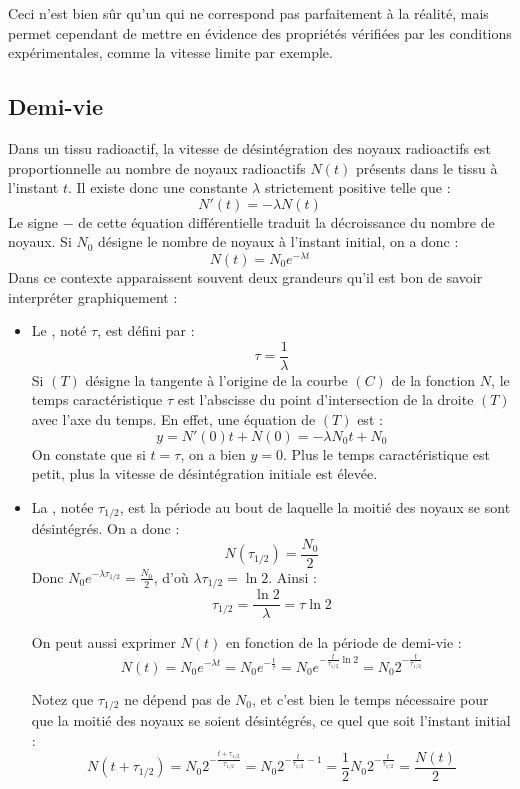 \documentclass[class=report,crop=false]{standalone}
\begin{document}
Ceci n'est bien sûr qu'un  qui ne correspond
pas parfaitement à la réalité, mais permet cependant de mettre en évidence
des propriétés vérifiées par les conditions expérimentales, comme la vitesse limite par exemple.


\subsection{Demi-vie}

Dans un tissu radioactif, la vitesse de désintégration des noyaux radioactifs
est proportionnelle au nombre de noyaux radioactifs $N(t)$ présents dans le
tissu à l'instant $t$. Il existe donc une constante $\lambda$ strictement positive telle que :
$$N'(t) = -\lambda N(t)$$
Le signe \og $-$\fg{} de cette équation différentielle traduit la
décroissance du nombre de noyaux.
Si $N_0$ désigne le nombre de noyaux à l'instant initial, on a donc :
$$N(t) = N_0 e^{-\lambda t}$$
Dans ce contexte apparaissent souvent deux grandeurs qu'il est bon de
savoir interpréter graphiquement :
\begin{itemize}
  \item Le , noté $\tau$, est défini par :
  $$\tau = \frac{1}{\lambda}$$
  Si $(T)$ désigne la tangente à l'origine de la courbe $(C)$ de la fonction $N$,
  le temps caractéristique $\tau$ est l'abscisse du point d'intersection de la
  droite $(T)$ avec l'axe du temps. En effet, une équation de $(T)$ est :
  $$y = N'(0)t + N(0) = -\lambda N_0 t + N_0$$
On constate que si $t = \tau$, on a bien $y = 0$.
Plus le temps caractéristique est petit,
plus la vitesse de désintégration initiale est élevée.



  \item La , notée $\tau_{1/2}$,
  est la période au bout de laquelle la moitié des noyaux se
  sont désintégrés. On a donc :
  $$N(\tau_{1/2}) = \frac{N_0}{2}$$
  Donc $N_0 e^{ -\lambda \tau_{1/2} } =   \frac{N_0}{2}$, d'où
  $\lambda \tau_{1/2} = \ln 2$.
  Ainsi :
  $$\tau_{1/ 2} = \frac{\ln 2}{\lambda} = \tau \ln 2$$


  On peut aussi exprimer $N(t)$ en fonction de la période de demi-vie :
  $$N(t) = N_0 e^{-\lambda t} = N_0 e^{-\frac{t}{\tau}}
  =  N_0 e^{-\frac{t}{\tau_{1/2}} \ln 2} = N_0 2^{-\frac{t}{\tau_{1/2}}}$$

    Notez que $\tau_{1/ 2}$ ne dépend pas de $N_0$, et c'est bien le
    temps nécessaire pour que la moitié des noyaux se
  soient désintégrés, ce quel que soit l'instant initial :
  $$N(t+\tau_{1/ 2}) = N_0 2^{-\frac{t+\tau_{1/2}}{\tau_{1/2}}}
  = N_0 2^{-\frac{t}{\tau_{1/2}}-1} = \frac12 N_0 2^{-\frac{t}{\tau_{1/2}}}
  = \frac{N(t)}{2}$$

\end{itemize}
\end{document}
